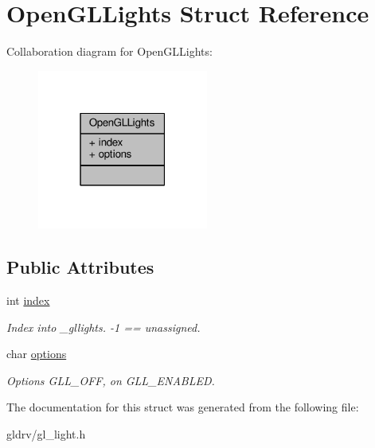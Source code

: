 \hypertarget{structOpenGLLights}{}\section{Open\+G\+L\+Lights Struct Reference}
\label{structOpenGLLights}


Collaboration diagram for Open\+G\+L\+Lights\+:
\nopagebreak
\begin{figure}[H]
\begin{center}
\leavevmode
\includegraphics[width=159pt]{d2/da0/structOpenGLLights__coll__graph}
\end{center}
\end{figure}
\subsection*{Public Attributes}
\begin{DoxyCompactItemize}
\item 
int \hyperlink{structOpenGLLights_a9f0be52dc0a7c72aeaa1a4f73ab8b185}{index}\hypertarget{structOpenGLLights_a9f0be52dc0a7c72aeaa1a4f73ab8b185}{}\label{structOpenGLLights_a9f0be52dc0a7c72aeaa1a4f73ab8b185}

\begin{DoxyCompactList}\small\item\em Index into \+\_\+gllights. -\/1 == unassigned. \end{DoxyCompactList}\item 
char \hyperlink{structOpenGLLights_a459817d162ffbb33fdaa0cdb1dd91e09}{options}\hypertarget{structOpenGLLights_a459817d162ffbb33fdaa0cdb1dd91e09}{}\label{structOpenGLLights_a459817d162ffbb33fdaa0cdb1dd91e09}

\begin{DoxyCompactList}\small\item\em Options G\+L\+L\+\_\+\+O\+FF, on G\+L\+L\+\_\+\+E\+N\+A\+B\+L\+ED. \end{DoxyCompactList}\end{DoxyCompactItemize}


The documentation for this struct was generated from the following file\+:\begin{DoxyCompactItemize}
\item 
gldrv/gl\+\_\+light.\+h\end{DoxyCompactItemize}
